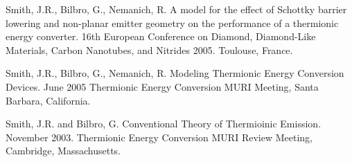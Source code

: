 \documentclass[letterpaper,margin,line]{res}
\begin{document}
\begin{resume}

Smith, J.R., Bilbro, G., Nemanich, R. A model for the effect of Schottky barrier lowering and non-planar emitter geometry on the performance of a thermionic energy converter. 16th European Conference on Diamond, Diamond-Like Materials, Carbon Nanotubes, and Nitrides 2005. Toulouse, France.

Smith, J.R., Bilbro, G., Nemanich, R. Modeling Thermionic Energy Conversion Devices. June 2005 Thermionic Energy Conversion MURI Meeting, Santa Barbara, California.

Smith, J.R. and Bilbro, G. Conventional Theory of Thermioinic Emission. November 2003. Thermionic Energy Conversion MURI Review Meeting, Cambridge, Massachusetts.


\end{resume}
\end{document}
